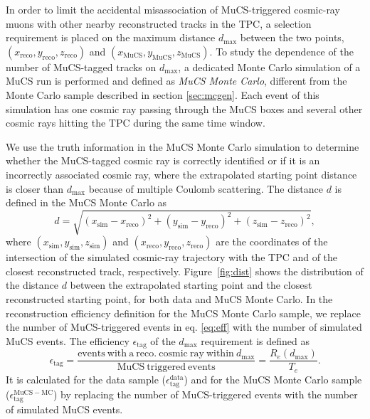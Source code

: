 \documentclass[a4paper,11pt]{article}
\begin{document}
In order to limit the accidental misassociation of MuCS-triggered cosmic-ray muons with other nearby reconstructed tracks in the TPC, a selection requirement is placed on the maximum distance $d_{\mathrm{max}}$ between the two points, $(x_{\mathrm{reco}},y_{\mathrm{reco}},z_{\mathrm{reco}})$ and $(x_{\mathrm{MuCS}},y_{\mathrm{MuCS}},z_{\mathrm{MuCS}})$.
To study the dependence of the number of MuCS-tagged tracks on $d_{\mathrm{max}}$, a dedicated Monte Carlo simulation of a MuCS run is performed and defined as \emph{MuCS Monte Carlo}, different from the Monte Carlo sample described in section \ref{sec:mcgen}. Each event of this simulation has one cosmic ray passing through the MuCS boxes and several other cosmic rays hitting the TPC during the same time window.

We use the truth information in the MuCS Monte Carlo simulation to determine whether the MuCS-tagged cosmic ray is correctly identified or if it is an incorrectly associated cosmic ray, where the extrapolated starting point distance is closer than $d_{\mathrm{max}}$ because of multiple Coulomb scattering.
The distance $d$ is defined in the MuCS Monte Carlo as
\begin{equation}\label{eq:d_mc}
d = \sqrt{(x_{\mathrm{sim}}-x_{\mathrm{reco}})^2+(y_{\mathrm{sim}}-y_{\mathrm{reco}})^2+(z_{\mathrm{sim}}-z_{\mathrm{reco}})^2},
\end{equation}
where $(x_{\mathrm{sim}},y_{\mathrm{sim}},z_{\mathrm{sim}})$ and $(x_{\mathrm{reco}},y_{\mathrm{reco}},z_{\mathrm{reco}})$ are the coordinates of the intersection of the simulated cosmic-ray trajectory with the TPC and of the closest reconstructed track, respectively. Figure~\ref{fig:dist} shows the distribution of the distance $d$ between the extrapolated starting point and the closest reconstructed starting point, for both data and MuCS Monte Carlo.
In the reconstruction efficiency definition for the MuCS Monte Carlo sample, we replace the number of MuCS-triggered events in eq. \eqref{eq:eff} with the number of simulated MuCS events. The efficiency $\epsilon_{\mathrm{tag}}$ of the $d_{\mathrm{max}}$ requirement is defined as
\begin{equation}
  \epsilon_{\mathrm{tag}}=\frac{\mathrm{events~with~a~reco.~cosmic~ray~within~}d_{\mathrm{max}}}{\mathrm{MuCS~triggered~events}} = \frac{R_{e}(d_{\mathrm{max}})}{T_{e}}.
\end{equation}
It is calculated for the data sample ($\epsilon^{\mathrm{data}}_{\mathrm{tag}}$) and for the MuCS Monte Carlo sample ($\epsilon^{\mathrm{MuCS-MC}}_{\mathrm{tag}}$) by replacing the number of MuCS-triggered events with the number of simulated MuCS events.
\end{document}
